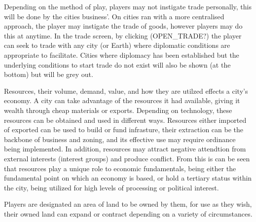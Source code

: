Depending on the method of play, players may not instigate trade personally, this will be done by the cities business'. On cities ran with a more centralised approach, the player may instigate the trade of goods, however players may do this at anytime. In the trade screen, by clicking (OPEN_TRADE?) the player can seek to trade with any city (or Earth) where diplomatic conditions are appropriate to facilitate. Cities where diplomacy has been established but the underlying conditions to start trade do not exist will also be shown (at the bottom) but will be grey out.  



Resources, their volume, demand, value, and how they are utilzed  effects a city's economy. A city can take advantage of the resources it had available, giving it wealth through cheap materials or exports. Depending on technology, these resources can be obtained and used in different ways. Resources either imported of exported can be used to build or fund infrasture, their extraction can be the backbone of business and zoning, and its effective use may require ordinance being implemented. In addition, resources may attract negative attendtion from external interests (interest groups) and produce conflict. From this is can be seen that resources play a unique role to economic fundamentals, being either the fundamental point on which an economy is based, or hold a tertiary status within the city, being utilized for high levels of processing or political interest.



Players are designated an area of land to be owned by them, for use as they wish, their owned land can expand or contract depending on a variety of circumstances. 

